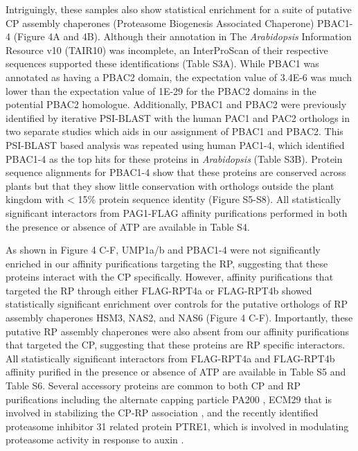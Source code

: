 Intriguingly, these samples also show statistical enrichment for a suite of putative CP assembly chaperones (Proteasome Biogenesis Associated Chaperone) PBAC1-4 (Figure 4A and 4B). Although their annotation in The \textit{Arabidopsis} Information Resource v10 (TAIR10) was incomplete, an InterProScan of their respective sequences supported these identifications (Table S3A). While PBAC1 was annotated as having a PBAC2 domain, the expectation value of 3.4E-6 was much lower than the expectation value of 1E-29 for the PBAC2 domains in the potential PBAC2 homologue. Additionally, PBAC1 and PBAC2 were previously identified by iterative PSI-BLAST with the human PAC1 and PAC2 orthologs in two separate studies \citep{kusmierczyk11, le07} which aids in our assignment of PBAC1 and PBAC2. This PSI-BLAST based analysis was repeated using human PAC1-4, which identified PBAC1-4 as the top hits for these proteins in \textit{Arabidopsis} (Table S3B). Protein sequence alignments for PBAC1-4 show that these proteins are conserved across plants but that they show little conservation with orthologs outside the plant kingdom with < 15\% protein sequence identity (Figure S5-S8).  All statistically significant interactors from PAG1-FLAG affinity purifications performed in both the presence or absence of ATP are available in Table S4.

As shown in Figure 4 C-F, UMP1a/b and PBAC1-4 were not significantly enriched in our affinity purifications targeting the RP, suggesting that these proteins interact with the CP specifically. However, affinity purifications that targeted the RP through either FLAG-RPT4a or FLAG-RPT4b showed statistically significant enrichment over controls for the putative orthologs of RP assembly chaperones HSM3, NAS2, and NAS6 (Figure 4 C-F). Importantly, these putative RP assembly chaperones were also absent from our affinity purifications that targeted the CP, suggesting that these proteins are RP specific interactors. All statistically significant interactors from FLAG-RPT4a and FLAG-RPT4b affinity purified in the presence or absence of ATP are available in Table S5 and Table S6. Several accessory proteins are common to both CP and RP purifications including the alternate capping particle PA200 \citep{book10}, ECM29 that is involved in stabilizing the CP-RP association \citep{lehmann10}, and the recently identified proteasome inhibitor 31 related protein PTRE1, which is involved in modulating proteasome activity in response to auxin \citep{yang16}. 

